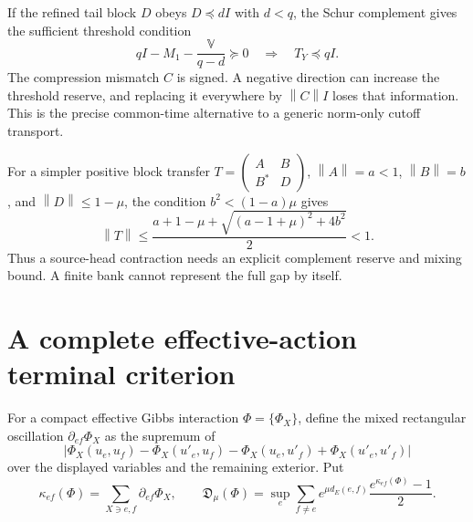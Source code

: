 \documentclass[11pt,oneside,openany]{book}
\theoremstyle{definition}
\theoremstyle{remark}
\newcommand{\norm}[1]{\left\lVert#1\right\rVert}
\begin{document}
If the refined tail block $D$ obeys $D\preceq dI$ with $d<q$, the Schur complement gives the sufficient threshold condition
\begin{equation}\label{eq:transport-threshold}
qI-M_1-\frac{\mathbb V}{q-d}\succeq0
\quad\Longrightarrow\quad T_Y\preceq qI.
\end{equation}
The compression mismatch $C$ is signed. A negative direction can increase the threshold reserve, and replacing it everywhere by $\norm C I$ loses that information. This is the precise common-time alternative to a generic norm-only cutoff transport. \cite{GT}

For a simpler positive block transfer $T=\left(\begin{smallmatrix}A&B\\B^*&D\end{smallmatrix}\right)$, $\norm A=a<1$, $\norm B=b$, and $\norm D\le1-\mu$, the condition $b^2<(1-a)\mu$ gives
\begin{equation}\label{eq:2x2-transfer}
\norm T\le\frac{a+1-\mu+\sqrt{(a-1+\mu)^2+4b^2}}2<1.
\end{equation}
Thus a source-head contraction needs an explicit complement reserve and mixing bound. A finite bank cannot represent the full gap by itself.

\section{A complete effective-action terminal criterion}
For a compact effective Gibbs interaction $\Phi=\{\Phi_X\}$, define the mixed rectangular oscillation $\partial_{ef}\Phi_X$ as the supremum of
\[
|\Phi_X(u_e,u_f)-\Phi_X(u'_e,u_f)-\Phi_X(u_e,u'_f)+\Phi_X(u'_e,u'_f)|
\]
over the displayed variables and the remaining exterior. Put
\[
\kappa_{ef}(\Phi)=\sum_{X\ni e,f}\partial_{ef}\Phi_X,
\qquad
\mathfrak D_\mu(\Phi)=\sup_e\sum_{f\ne e}e^{\mu d_E(e,f)}
\frac{e^{\kappa_{ef}(\Phi)}-1}{2}.
\]
\end{document}
